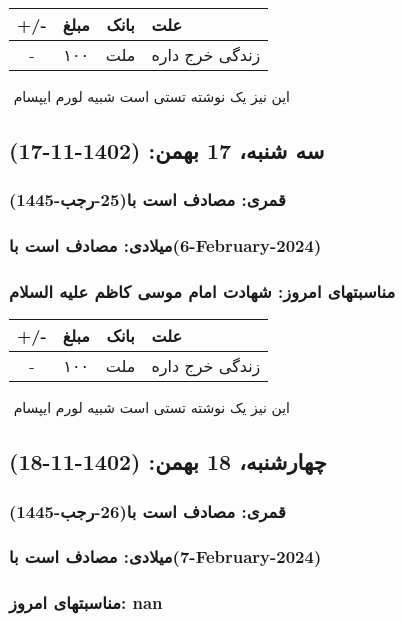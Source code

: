 \documentclass{article}
\newcommand{\rnote}[1]{\marginpar{\textcolor{color}{\StrSubstitute{\##1}{ }{\_}}}}
\newcommand{\myRow}[4]{
    #1 & #2 & #3 & #4 \\ \hline
}
\begin{document}
\begin{tabular}{ | c | c | c | p{5cm} |}
    \hline
    \myRow{ +/- }{مبلغ}{بانک}{علت}
    \myRow{-}{۱۰۰}{ملت}{زندگی خرج داره}
\end{tabular}
\newline
\newline

‌
\rnote{تست}
این نیز یک نوشته تستی است شبیه لورم ایپسام




\newpage
{}
\textcolor{color}{
\section{ سه شنبه، 17 بهمن: (1402-11-17) }
\subsubsection*{قمری: مصادف است با(25-رجب-1445)} 
\subsubsection*{میلادی: مصادف است با(6-February-2024)}
\subsubsection*{مناسبتهای امروز: شهادت امام موسی کاظم علیه السلام}
}


\begin{tabular}{ | c | c | c | p{5cm} |}
    \hline
    \myRow{ +/- }{مبلغ}{بانک}{علت}
    \myRow{-}{۱۰۰}{ملت}{زندگی خرج داره}
\end{tabular}
\newline
\newline

‌
\rnote{تست}
این نیز یک نوشته تستی است شبیه لورم ایپسام




\newpage
{}
\textcolor{color}{
\section{ چهارشنبه، 18 بهمن: (1402-11-18) }
\subsubsection*{قمری: مصادف است با(26-رجب-1445)} 
\subsubsection*{میلادی: مصادف است با(7-February-2024)}
\subsubsection*{مناسبتهای امروز: nan}
}
\end{document}
